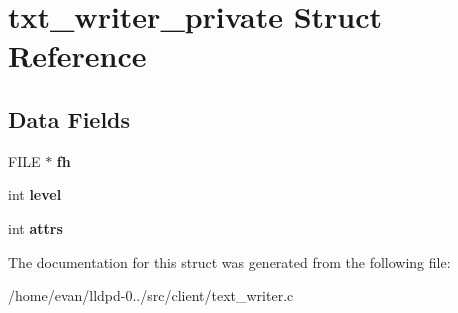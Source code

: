 \section{txt\-\_\-writer\-\_\-private \-Struct \-Reference}
\label{structtxt__writer__private}
\subsection*{\-Data \-Fields}
\begin{DoxyCompactItemize}
\item 
\-F\-I\-L\-E $\ast$ {\bfseries fh}\label{structtxt__writer__private_a77679c3e1b0f04ed2c76e00e41363351}

\item 
int {\bfseries level}\label{structtxt__writer__private_acf4d33ee4cff36f69b924471174dcb11}

\item 
int {\bfseries attrs}\label{structtxt__writer__private_aff3c59bb1466dbdd59e98b0fe131b595}

\end{DoxyCompactItemize}


\-The documentation for this struct was generated from the following file\-:\begin{DoxyCompactItemize}
\item 
/home/evan/lldpd-\/0../src/client/text\-\_\-writer.\-c\end{DoxyCompactItemize}
